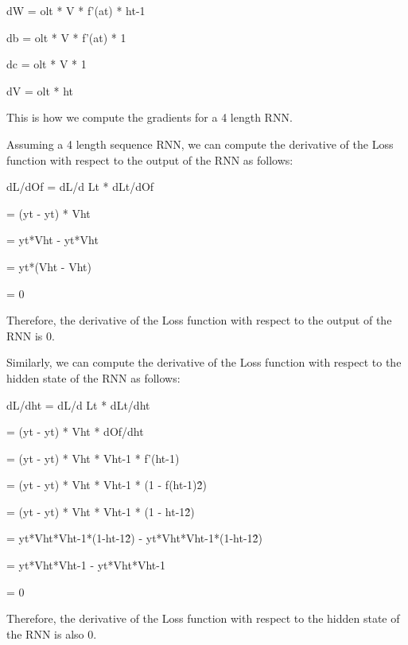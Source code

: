 \documentclass{article}
\begin{document}
	dW = olt * V * f'(at) * ht-1
	
	db = olt * V * f'(at) * 1
	
	dc = olt * V * 1
	
	dV = olt * ht
	
	This is how we compute the gradients for a 4 length RNN.
	
	Assuming a 4 length sequence RNN, we can compute the derivative of the Loss function with respect to the output of the RNN as follows:
	
	dL/dOf = dL/d Lt * dLt/dOf
	
	= (yt - yt) * Vht
	
	= yt*Vht - yt*Vht
	
	= yt*(Vht - Vht)
	
	= 0
	
	Therefore, the derivative of the Loss function with respect to the output of the RNN is 0.
	
	Similarly, we can compute the derivative of the Loss function with respect to the hidden state of the RNN as follows:
	
	dL/dht = dL/d Lt * dLt/dht
	
	= (yt - yt) * Vht * dOf/dht
	
	= (yt - yt) * Vht * Vht-1 * f'(ht-1)
	
	= (yt - yt) * Vht * Vht-1 * (1 - f(ht-1)\^2)
	
	= (yt - yt) * Vht * Vht-1 * (1 - ht-1\^2)
	
	= yt*Vht*Vht-1*(1-ht-1\^2) - yt*Vht*Vht-1*(1-ht-1\^2)
	
	= yt*Vht*Vht-1 - yt*Vht*Vht-1
	
	= 0
	
	Therefore, the derivative of the Loss function with respect to the hidden state of the RNN is also 0.
	
	\clearpage
	
	\printbibliography
	
	
\end{document}
